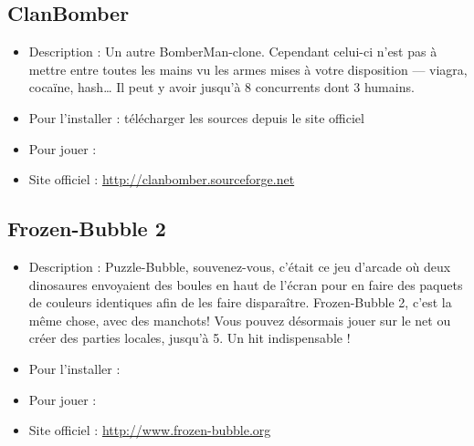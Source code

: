 \subsection{ClanBomber}
\begin{itemize}
\begingroup
{}
\item Description : Un autre BomberMan-clone. Cependant celui-ci n'est pas à mettre entre toutes les mains vu les armes mises à votre disposition --- viagra, cocaïne, hash\ldots{} Il peut y avoir jusqu'à 8 concurrents dont 3 humains.{\par}
\item Pour l'installer : télécharger les sources depuis le site officiel{\par}
\item Pour jouer : 
\item Site officiel : \url{http://clanbomber.sourceforge.net}{\par}
\endgroup
\end{itemize}
\subsection{Frozen-Bubble 2}
\begin{itemize}
\begingroup
{}
\item Description : Puzzle-Bubble, souvenez-vous, c'était ce jeu d'arcade où deux dinosaures envoyaient des boules en haut de l'écran pour en faire des paquets de couleurs identiques afin de les faire disparaître. Frozen-Bubble 2, c'est la même chose, avec des manchots!  Vous pouvez désormais jouer sur le net ou créer des parties locales, jusqu'à 5. Un hit indispensable !{\par}
\endgroup
\item Pour l'installer : 
\item Pour jouer : 
\item Site officiel : \url{http://www.frozen-bubble.org}{\par}
\end{itemize}

